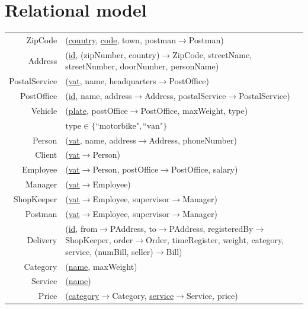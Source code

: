 \documentclass{report}[a4paper]
\theoremstyle{remark}
\begin{document}
\chapter{Relational model}
\begin{center} \setlength{\tabcolsep}{1pt}
    \begin{tabular}{r p{144mm}}
        ZipCode         & (\uline{country}, \uline{code}, town, postman$\rightarrow$Postman)  \\
        Address         & (\uline{id}, (zipNumber, country)$\rightarrow$ZipCode, streetName, streetNumber, doorNumber, personName) \\
        PostalService   & (\uline{vat}, name, headquarters$\rightarrow$PostOffice)              \\
        PostOffice      & (\uline{id}, name, address$\rightarrow$Address, postalService$\rightarrow$PostalService) \\
        Vehicle         & (\uline{plate}, postOffice$\rightarrow$PostOffice, maxWeight, type) \\
                        & $\text{type} \in \{\text{``motorbike"}, \text{``van"}\}$\\
        Person          & (\uline{vat}, name, address$\rightarrow$Address, phoneNumber)         \\
        Client          & (\uline{vat}$\rightarrow$Person)                                      \\
        Employee        & (\uline{vat}$\rightarrow$Person, postOffice$\rightarrow$PostOffice, salary) \\
        Manager         & (\uline{vat}$\rightarrow$Employee)                                    \\
        ShopKeeper      & (\uline{vat}$\rightarrow$Employee, supervisor$\rightarrow$Manager)    \\
        Postman         & (\uline{vat}$\rightarrow$Employee, supervisor$\rightarrow$Manager)    \\
        Delivery        & (\uline{id}, from$\rightarrow$PAddress, to$\rightarrow$PAddress, registeredBy$\rightarrow$ShopKeeper, order$\rightarrow$Order, timeRegister, weight, category, service, (numBill, seller)$\rightarrow$Bill) \\
        Category        & (\uline{name}, maxWeight) \\
        Service         & (\uline{name}) \\
        Price           & (\uline{category}$\rightarrow$Category, \uline{service}$\rightarrow$Service, price) \\

\end{tabular}
\end{center}
\end{document}
